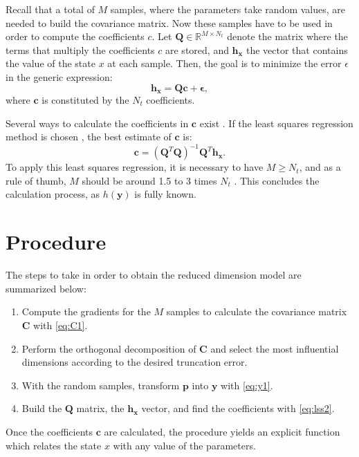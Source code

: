 Recall that a total of $M$ samples, where the parameters take random values, are needed to build the covariance matrix. Now these samples have to be used in order to compute the coefficients $c$. Let $\mathbf{Q} \in \mathbb{R}^{M \times N_t}$ denote the matrix where the terms that multiply the coefficients $c$ are stored, and $\mathbf{h_x}$ the vector that contains the value of the state $x$ at each sample. Then, the goal is to minimize the error $\epsilon$ in the generic expression:
\begin{equation}
  \mathbf{h_x} = \mathbf{Q} \mathbf{c} + \mathbf{\epsilon},
  \label{eq:lss}
\end{equation}
where $\mathbf{c}$ is constituted by the $N_t$ coefficients. 

Several ways to calculate the coefficients in $\mathbf{c}$ exist \cite{shen2020}. If the least squares regression method is chosen \cite{shin2016}, the best estimate of $\mathbf{c}$ is: 
\begin{equation}
  \mathbf{c} = \left(\mathbf{Q}^T \mathbf{Q}\right)^{-1} \mathbf{Q}^T \mathbf{h_x}.
  \label{eq:lss2}
\end{equation}
To apply this least squares regression, it is necessary to have $M \geq N_t$, and as a rule of thumb, $M$ should be around 1.5 to 3 times $N_t$ \cite{shin2016}. This concludes the calculation process, as $h(\mathbf{y})$ is fully known. 


\section{Procedure}\label{sec:process}
The steps to take in order to obtain the reduced dimension model are summarized below:
\begin{enumerate}
  \item Compute the gradients for the $M$ samples to calculate the covariance matrix $\mathbf{C}$ with \eqref{eq:C1}. 
  \item Perform the orthogonal decomposition of $\mathbf{C}$ and select the most influential dimensions according to the desired truncation error. 
  \item With the random samples, transform $\mathbf{p}$ into $\mathbf{y}$ with \eqref{eq:y1}. 
  \item Build the $\mathbf{Q}$ matrix, the $\mathbf{h_x}$ vector, and find the coefficients with \eqref{eq:lss2}. 
\end{enumerate}
Once the coefficients $\mathbf{c}$ are calculated, the procedure yields an explicit function which relates the state $x$ with any value of the parameters. 

